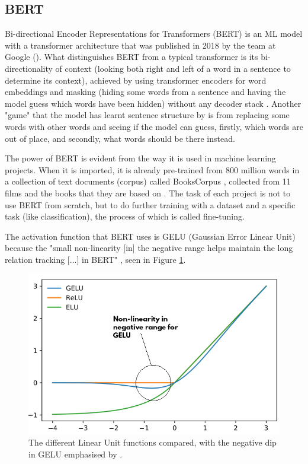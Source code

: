 \documentclass{l4proj}
\begin{document}
\subsection{BERT}

Bi-directional Encoder Representations for Transformers (BERT) is an ML model with a transformer architecture that was published in 2018 by the team at Google (\citeauthor{BERT}). What distinguishes BERT from a typical transformer is its bi-directionality of context (looking both right and left of a word in a sentence to determine its context), achieved by using transformer encoders for word embeddings and masking (hiding some words from a sentence and having the model guess which words have been hidden) without any decoder stack \citep{BERTExplained}. Another "game" that the model has learnt sentence structure by is from replacing some words with other words and seeing if the model can guess, firstly, which words are out of place, and secondly, what words should be there instead.

The power of BERT is evident from the way it is used in machine learning projects. When it is imported, it is already pre-trained from 800 million words in a collection of text documents (corpus) called BooksCorpus \citep{BERT}, collected from 11 films and the books that they are based on \citep{BooksCorpus}. The task of each project is not to use BERT from scratch, but to do further training with a dataset and a specific task (like classification), the process of which is called fine-tuning.

The activation function that BERT uses is GELU (Gaussian Error Linear Unit) because the "small non-linearity [in] the negative range helps maintain the long relation tracking [...] in BERT" \citep{BERTGELU}, seen in Figure \ref{fig:BERTGELU}.

\begin{figure}
    \centering
    \includegraphics[width=0.8\linewidth]{images/Background/BERT GELU.png}    

    \caption{The different Linear Unit functions compared, with the negative dip in GELU emphasised by \citet{BERTGELUFigure}.}
    \label{fig:BERTGELU} 
\end{figure}
\end{document}
